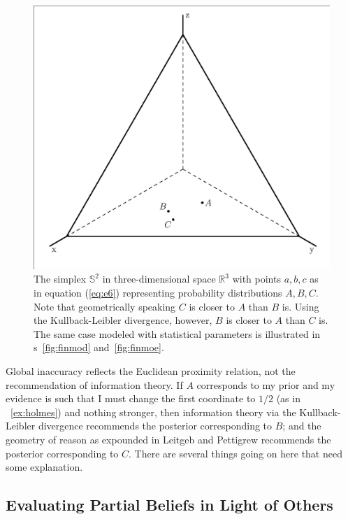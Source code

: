 \documentclass[phd,12pt,oneside]{ubcthesis}
\begin{document}
\begin{figure}[ht!]
    \begin{minipage}[h]{.7\linewidth}
      \includegraphics[width=\textwidth]{threepoints.eps}
      \caption{\footnotesize The simplex $\mathbb{S}^{2}$ in
        three-dimensional space $\mathbb{R}^{3}$ with points $a,b,c$
        as in equation (\ref{eq:e6}) representing probability
        distributions $A,B,C$. Note that geometrically speaking $C$ is
        closer to $A$ than $B$ is. Using the Kullback-Leibler
        divergence, however, $B$ is closer to $A$ than $C$ is. The
        same case modeled with statistical parameters is illustrated
        in {\igure}s~\ref{fig:finmod} and~\ref{fig:finmoe}.}
      \label{fig:threepoints}
    \end{minipage}
\end{figure}

Global inaccuracy reflects the Euclidean proximity relation, not the
re\-commendation of information theory. If $A$ corresponds to my prior
and my evidence is such that I must change the first coordinate to
$1/2$ (as in {\xample}~\ref{ex:holmes}) and nothing stronger, then
information theory via the Kullback-Leibler divergence re\-commends
the posterior corresponding to $B$; and the geometry of reason as
expounded in Leitgeb and Pettigrew recommends the posterior
corresponding to $C$. There are several things going on here that need
some explanation.

\subsection{Evaluating Partial Beliefs in Light of Others}
\label{subsec:aichavag}
\end{document}
